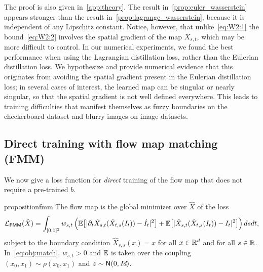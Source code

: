 The proof is also given in~\cref{app:theory}.
%
The result in~\cref{prop:euler_wasserstein} appears stronger than the result in~\cref{prop:lagrange_wasserstein}, because it is independent of any Lipschitz constant.
%
Notice, however, that unlike~\eqref{eq:W2:1} the bound~\eqref{eq:W2:2} involves the spatial gradient of the map $X_{s,t}$, which may be more difficult to control.
%
In our numerical experiments, we found the best performance when using the Lagrangian distillation loss, rather than the Eulerian distillation loss.
%
We hypothesize and provide numerical evidence that this originates from avoiding the spatial gradient present in the Eulerian distillation loss; in several cases of interest, the learned map can be singular or nearly singular, so that the spatial gradient is not well defined everywhere.
%
This leads to training difficulties that manifest themselves as fuzzy boundaries on the checkerboard dataset and blurry images on image datasets.

\subsection{Direct training with flow map matching (FMM)}
\label{ssec:direct}
%
We now give a loss function for \emph{direct} training of the flow map that does not require a pre-trained $b$.

\begin{restatable}{proposition}{fmm}
	\label{prop:fmm}
	The flow map is the global minimizer over $\hat{X}$ of the loss
	\begin{align}
		\label{eq:obj:match}
		\mathcal{L}_{\mathsf{FMM}}(\hat X) = \int_{[0,1]^2} w_{s,t} \left(\mathbb{E} \big [| \partial_t \hat X_{s,t} (\hat X_{t,s}(I_t)) - \dot{I}_t|^2\big] + \mathbb{E} \big [| \hat X_{s,t} (\hat X_{t,s}(I_t)) - I_t|^2 \big]\right) ds dt,
	\end{align}
	subject to the boundary condition $\hat{X}_{s, s}(x) = x$ for all $x \in \mathbb{R}^d$ and for all $s \in \mathbb{R}$.
	In~\eqref{eq:obj:match}, $w_{s,t} > 0$ and $\mathbb{E}$ is taken over the coupling $(x_0, x_1) \sim \rho(x_0, x_1)$ and $z \sim \mathsf N(0, \text{\it Id})$.
\end{restatable}

